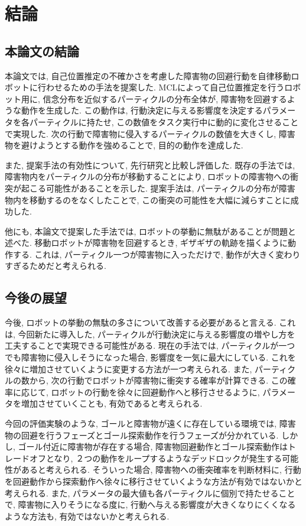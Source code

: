 \chapter{結論} \label{chapter:conclusion}

\section{本論文の結論}
本論文では, 自己位置推定の不確かさを考慮した障害物の回避行動を自律移動ロボットに行わせるための手法を提案した. 
MCLによって自己位置推定を行うロボット用に, 信念分布を近似するパーティクルの分布全体が, 障害物を回避するような動作を生成した. 
この動作は, 行動決定に与える影響度を決定するパラメータを各パーティクルに持たせ, この数値をタスク実行中に動的に変化させることで実現した. 
次の行動で障害物に侵入するパーティクルの数値を大きくし, 障害物を避けようとする動作を強めることで, 目的の動作を達成した. 

また, 提案手法の有効性について, 先行研究と比較し評価した. 
既存の手法では, 障害物内をパーティクルの分布が移動することにより, ロボットの障害物への衝突が起こる可能性があることを示した. 
提案手法は, パーティクルの分布が障害物内を移動するのをなくしたことで, この衝突の可能性を大幅に減らすことに成功した. 

他にも, 本論文で提案した手法では, ロボットの挙動に無駄があることが問題と述べた. 
移動ロボットが障害物を回避するとき, ギザギザの軌跡を描くように動作する. 
これは, パーティクル一つが障害物に入っただけで, 動作が大きく変わりすぎるためだと考えられる. 


\section{今後の展望}
今後, ロボットの挙動の無駄の多さについて改善する必要があると言える. 
これは, 今回新たに導入した, パーティクルが行動決定に与える影響度の増やし方を工夫することで実現できる可能性がある. 
現在の手法では, パーティクルが一つでも障害物に侵入しそうになった場合, 影響度を一気に最大にしている. 
これを徐々に増加させていくように変更する方法が一つ考えられる. 
また, パーティクルの数から, 次の行動でロボットが障害物に衝突する確率が計算できる. 
この確率に応じて, ロボットの行動を徐々に回避動作へと移行させるように, パラメータを増加させていくことも, 有効であると考えられる. 

今回の評価実験のような, ゴールと障害物が遠くに存在している環境では, 
障害物の回避を行うフェーズとゴール探索動作を行うフェーズが分かれている. 
しかし, ゴール付近に障害物が存在する場合, 障害物回避動作とゴール探索動作はトレードオフとなり, 
２つの動作をループするようなデッドロックが発生する可能性があると考えられる. 
そういった場合, 障害物への衝突確率を判断材料に, 行動を回避動作から探索動作へ徐々に移行させていくような方法が有効ではないかと考えられる. 
また, パラメータの最大値も各パーティクルに個別で持たせることで, 
障害物に入りそうになる度に, 行動へ与える影響度が大きくなりにくくなるような方法も, 有効ではないかと考えられる. 
